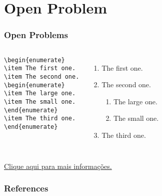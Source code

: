 \documentclass[article,8pt]{beamer}%
\begin{document}
\section{Open Problem}
\begin{frame}[fragile]
\frametitle{Open Problems}

\begin{columns}
\begin{block}
\scriptsize{
\begin{verbatim}
\begin{enumerate}
\item The first one.
\item The second one.
\begin{enumerate}
\item The large one.
\item The small one.
\end{enumerate}
\item The third one.
\end{enumerate}
\end{verbatim}
}
\end{block}

\begin{enumerate}
\item The first one.
\item The second one.
\begin{enumerate}
\item The large one.
\item The small one.
\end{enumerate}
\item The third one.
\end{enumerate}
\end{columns}
\vspace{1.5cm}
\href{https://tug.ctan.org/macros/latex/contrib/beamer/doc/beameruserguide.pdf}{Clique aqui para mais informações.}

\end{frame}
\begin{frame}[allowframebreaks]
\frametitle{References}
\printbibliography
\end{frame}
\end{document}
